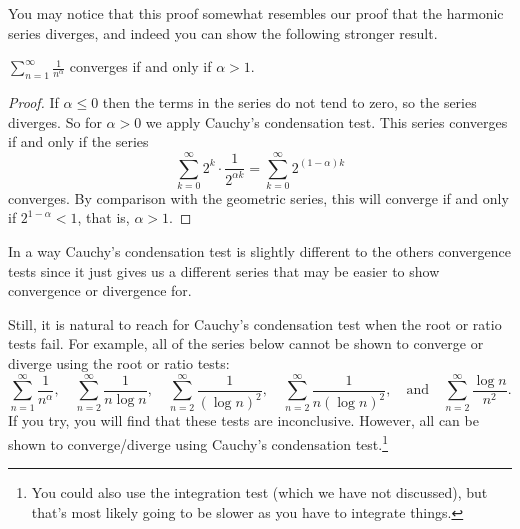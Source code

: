 You may notice that this proof somewhat resembles our proof that the harmonic series diverges, and indeed you can show the following stronger result.

\begin{theorem}
	$\sum_{n = 1}^{\infty} \frac{1}{n^\alpha}$ converges if and only if $\alpha > 1$.
\end{theorem}
\begin{proof}
If $\alpha \leq 0$ then the terms in the series do not tend to zero, so the series diverges. So for $\alpha > 0$ we apply Cauchy's condensation test. This series converges if and only if the series
$$
\sum_{k = 0}^{\infty} 2^k \cdot \frac{1}{2^{\alpha k}} = \sum_{k = 0}^{\infty} 2^{(1 - \alpha) k}
$$
converges. By comparison with the geometric series, this will converge if and only if $2^{1 - \alpha} < 1$, that is, $\alpha > 1$.
\end{proof}


In a way Cauchy's condensation test is slightly different to the others convergence tests since it just gives us a different series that may be easier to show convergence or divergence for.

Still, it is natural to reach for Cauchy's condensation test when the root or ratio tests fail. For example, all of the series below cannot be shown to converge or diverge using the root or ratio tests:
$$
\sum_{n=1}^{\infty} \frac{1}{n^{\alpha}}, \quad \sum_{n=2}^{\infty} \frac{1}{n \log n}, \quad \sum_{n=2}^{\infty} \frac{1}{(\log n)^{2}}, \quad \sum_{n=2}^{\infty} \frac{1}{n(\log n)^{2}}, \quad \text{and} \quad \sum_{n=2}^{\infty} \frac{\log n}{n^{2}}.
$$
If you try, you will find that these tests are inconclusive. However, all can be shown to converge/diverge using Cauchy's condensation test.\footnote{You could also use the integration test (which we have not discussed), but that's most likely going to be slower as you have to integrate things.}





	

